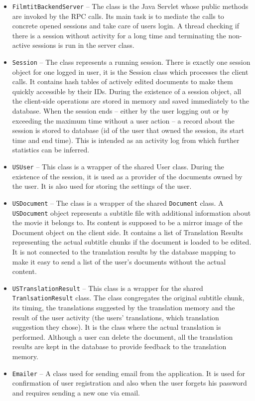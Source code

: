 \begin{itemize}
\item {\tt FilmtitBackendServer}  -- The class is the Java Servlet whose public methods are invoked by the RPC calls. Its main task is to mediate the calls to concrete opened sessions and take care of users login. A thread checking if there is a session without activity for a long time and terminating the non-active sessions is run in the server class.

\item {\tt Session} -- The class represents a running session. There is exactly one session object for one logged in user, it is the Session class which processes the client calls. It contains hash tables of actively edited documents to make them quickly accessible by their IDs. During the existence of a session object, all the client-side operations are stored in memory and saved immediately to the database. When the session ends -- either by the user logging out or by exceeding the maximum time without a user action -- a record about the session is stored to database (id of the user that owned the session, its start time and end time). This is intended as an activity log from which further statistics can be inferred.

\item {\tt USUser} -- This class is a wrapper of the shared User class. During the existence of the session, it is used as a provider of the documents owned by the user. It is also used for storing the settings of the user.

\item {\tt USDocument} -- The class is a wrapper of the shared {\tt Document} class. A {\tt USDocument} object represents a subtitle file with additional information about the movie it belongs to. Its content is supposed to be a mirror image of the Document object on the client side. It contains a list of Translation Results representing the actual subtitle chunks if the document is loaded to be edited. It is not connected to the translation results by the database mapping to make it easy to send a list of the user's documents without the actual content.

\item {\tt USTranslationResult} -- This class is a wrapper for the shared {\tt TranlsationResult} class. The class congregates the original subtitle chunk, its timing, the translations suggested by the translation memory and the result of the user activity (the users' translations, which translation suggestion they chose). It is the class where the actual translation is performed. Although a user can delete the document, all the translation results are kept in the database to provide feedback to the translation memory.

\item {\tt Emailer} -- A class used for sending email from the application. It is used for confirmation of user registration and also when the user forgets his password and requires sending a new one via email.

\end{itemize}

